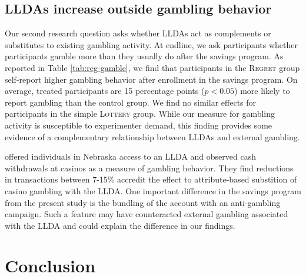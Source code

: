 \documentclass[12pt]{article}
\begin{document}

	\subsection{LLDAs increase outside gambling behavior}

		Our second research question asks whether LLDAs act as complements or substitutes to existing gambling activity. At endline, we ask participants whether participants gamble more than they usually do after the savings program. As reported in Table \ref{tab:reg-gamble}, we find that participants in the \textsc{Regret} group self-report higher gambling behavior after enrollment in the savings program. On average, treated participants are 15 percentage points ($p < 0.05$) more likely to report gambling than the control group. We find no similar effects for participants in the simple \textsc{Lottery} group. While our measure for gambling activity is susceptible to experimenter demand, this finding provides some evidence of a complementary relationship between LLDAs and external gambling.

		 offered individuals in Nebraska access to an LLDA and observed cash withdrawals at casinos as a measure of gambling behavior. They find reductions in transactions between 7-15\% accredit the effect to attribute-based substition of casino gambling with the LLDA. One important difference in the savings program from the present study is the bundling of the account with an anti-gambling campaign. Such a feature may have counteracted external gambling associated with the LLDA and could explain the difference in our findings.

\section{Conclusion} \label{sec:conclusion}
\end{document}

